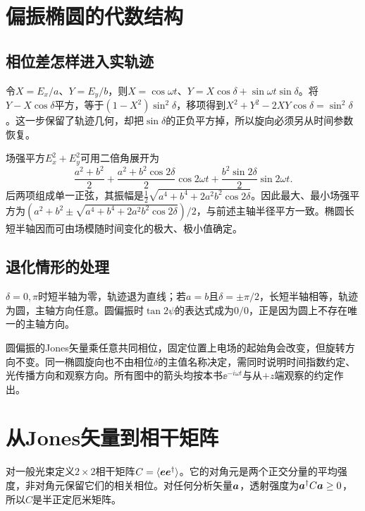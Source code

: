 \section{偏振椭圆的代数结构}
\subsection{相位差怎样进入实轨迹}
令$X=E_x/a$、$Y=E_y/b$，则$X=\cos\omega t$、$Y=X\cos\delta+\sin\omega t\sin\delta$。将$Y-X\cos\delta$平方，等于$(1-X^2)\sin^2\delta$，移项得到$X^2+Y^2-2XY\cos\delta=\sin^2\delta$。这一步保留了轨迹几何，却把$\sin\delta$的正负平方掉，所以旋向必须另从时间参数恢复。

场强平方$E_x^2+E_y^2$可用二倍角展开为
\[
 \frac{a^2+b^2}2+
 \frac{a^2+b^2\cos2\delta}2\cos2\omega t
 +\frac{b^2\sin2\delta}2\sin2\omega t.
\]
后两项组成单一正弦，其振幅是$\tfrac12\sqrt{a^4+b^4+2a^2b^2\cos2\delta}$。因此最大、最小场强平方为$(a^2+b^2\pm\sqrt{a^4+b^4+2a^2b^2\cos2\delta})/2$，与前述主轴半径平方一致。椭圆长短半轴因而可由场模随时间变化的极大、极小值确定。

\subsection{退化情形的处理}
$\delta=0,\pi$时短半轴为零，轨迹退为直线；若$a=b$且$\delta=\pm\pi/2$，长短半轴相等，轨迹为圆，主轴方向任意。圆偏振时$\tan2\psi$的表达式成为$0/0$，正是因为圆上不存在唯一的主轴方向。

圆偏振的Jones矢量乘任意共同相位，固定位置上电场的起始角会改变，但旋转方向不变。同一椭圆旋向也不由相位$\delta$的主值名称决定，需同时说明时间指数约定、光传播方向和观察方向。所有图中的箭头均按本书$\ee^{-i\omega t}$与从$+z$端观察的约定作出。

\section{从Jones矢量到相干矩阵}\label{th:o4coherence}
对一般光束定义$2\times2$相干矩阵$C=\langle\bm{e}\bm{e}^\dagger\rangle$。它的对角元是两个正交分量的平均强度，非对角元保留它们的相关相位。对任何分析矢量$\bm{a}$，透射强度为$\bm{a}^\dagger C\bm{a}\geq0$，所以$C$是半正定厄米矩阵。

